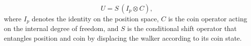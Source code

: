\begin{equation}
U = S \, (I_p \otimes C),
\label{eq:general_evolution}
\end{equation}
where \(I_p\) denotes the identity on the position space, \(C\) is the
coin operator acting on the internal degree of freedom, and \(S\) is
the conditional shift operator that entangles position and coin by
displacing the walker according to its coin state.
